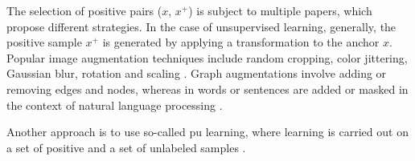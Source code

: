 The selection of positive pairs ($x$, $x^+$) is subject to multiple papers, 
which propose different strategies.
In the case of unsupervised learning, generally, 
the positive sample $x^+$ is generated by applying a transformation to the anchor $x$.
Popular image augmentation techniques include random cropping, color jittering, Gaussian blur,
rotation and scaling \citet{ho_contrastive_2020,robinson_contrastive_2021,curricular_weighting_2024}.
Graph augmentations involve adding or removing edges and nodes, 
whereas in words or sentences are added or masked in the context of natural language processing 
\citet{curricular_weighting_2024}.

Another approach is to use so-called \ac{pu} learning, where learning is carried out 
on a set of positive and a set of unlabeled samples \citet{chuang_debiased_2020}.